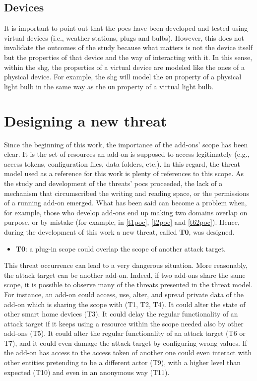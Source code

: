 \subsection{Devices}

It is important to point out that the \glspl{poc} have been developed and tested using virtual devices (i.e., weather stations, plugs and bulbs). However, this does not invalidate the outcomes of the study because what matters is not the device itself but the properties of that device and the way of interacting with it. In this sense, within the \gls{shg}, the properties of a virtual device are modeled like the ones of a physical device. For example, the \gls{shg} will model the \texttt{on} property of a physical light bulb in the same way as the \texttt{on} property of a virtual light bulb.



\section{Designing a new threat}
\label{t0appendix}

Since the beginning of this work, the importance of the add-ons' scope has been clear. It is
the set of resources an add-on is supposed to access legitimately (e.g., access tokens, configuration files, data folders, etc.). In this regard, the threat model used as a reference for this work is plenty of references to this scope.
As the study and development of the threats' \glspl{poc} proceeded, the lack of a mechanism that circumscribed the writing and reading space, or the permissions of a running add-on emerged. 
What has been said can become a problem when, for example, those who develop add-ons end up making two domains overlap on purpose, or by mistake (for example, in \autoref{t1poc}, \autoref{t2poc} and \autoref{t62poc}). Hence, during the development of this work a new threat, called \textbf{T0}, was designed.

\begin{itemize}
    \item \textbf{T0}: a plug-in scope could overlap the scope of another attack target.
\end{itemize}
This threat occurrence can lead to a very dangerous situation. More reasonably, the attack target can be another add-on. Indeed, if two add-ons share the same scope, it is possible to observe many of the threats presented in the threat model. For instance, an add-on could access, use, alter, and spread private data of the add-on which is sharing the scope with (T1, T2, T4). It could alter the state of other smart home devices (T3). It could delay the regular functionality of an attack target if it keeps using a resource within the scope needed also by other add-ons (T5). It could alter the regular functionality of an attack target (T6 or T7), and it could even damage the attack target by configuring wrong values.
If the add-on has access to the access token of another one could even interact with other entities pretending to be a different actor (T9), with a higher level than expected (T10) and even in an anonymous way (T11).

